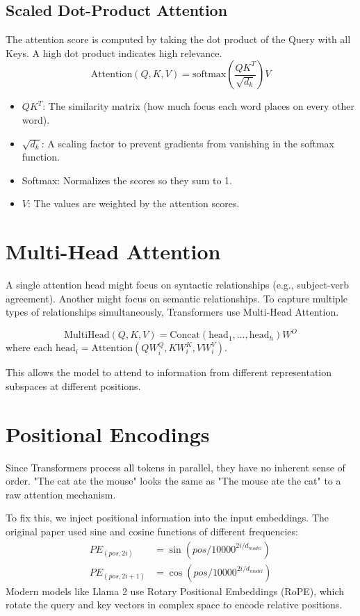 \subsection{Scaled Dot-Product Attention}
The attention score is computed by taking the dot product of the Query with all Keys. A high dot product indicates high relevance.
\begin{equation}
    \text{Attention}(Q, K, V) = \text{softmax}\left(\frac{QK^T}{\sqrt{d_k}}\right)V
\end{equation}
\begin{itemize}
    \item $QK^T$: The similarity matrix (how much focus each word places on every other word).
    \item $\sqrt{d_k}$: A scaling factor to prevent gradients from vanishing in the softmax function.
    \item Softmax: Normalizes the scores so they sum to 1.
    \item $V$: The values are weighted by the attention scores.
\end{itemize}

\section{Multi-Head Attention}

A single attention head might focus on syntactic relationships (e.g., subject-verb agreement). Another might focus on semantic relationships. To capture multiple types of relationships simultaneously, Transformers use Multi-Head Attention.

\begin{equation}
    \text{MultiHead}(Q, K, V) = \text{Concat}(\text{head}_1, \dots, \text{head}_h)W^O
\end{equation}
where each $\text{head}_i = \text{Attention}(QW_i^Q, KW_i^K, VW_i^V)$.

This allows the model to attend to information from different representation subspaces at different positions.

\section{Positional Encodings}

Since Transformers process all tokens in parallel, they have no inherent sense of order. "The cat ate the mouse" looks the same as "The mouse ate the cat" to a raw attention mechanism.

To fix this, we inject positional information into the input embeddings. The original paper used sine and cosine functions of different frequencies:
\begin{align}
    PE_{(pos, 2i)} &= \sin(pos / 10000^{2i/d_{model}}) \\
    PE_{(pos, 2i+1)} &= \cos(pos / 10000^{2i/d_{model}})
\end{align}
Modern models like Llama 2 \cite{touvron2023llama} use Rotary Positional Embeddings (RoPE), which rotate the query and key vectors in complex space to encode relative positions.

